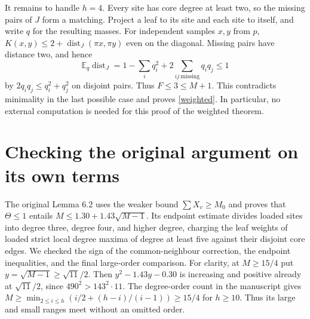 \documentclass[11pt,a4paper]{article}
\theoremstyle{remark}\newtheorem*{remark}{Remark}
\DeclareMathOperator{\dist}{dist}
\begin{document}
It remains to handle $h=4$. Every site has core degree at least two, so the missing pairs of $J$ form a matching. Project a leaf to its site and each site to itself, and write $q$ for the resulting masses. For independent samples $x,y$ from $p$, $K(x,y)\le2+\dist_J(\pi x,\pi y)$ even on the diagonal. Missing pairs have distance two, and hence
\[
 \mathbb E_q\dist_J
 =1-\sum_i q_i^2+2\sum_{ij\ \mathrm{missing}}q_iq_j\le1
\]
by $2q_iq_j\le q_i^2+q_j^2$ on disjoint pairs. Thus $F\le3\le M+1$. This contradicts minimality in the last possible case and proves \eqref{weighted}. In particular, no external computation is needed for this proof of the weighted theorem.

\section{Checking the original argument on its own terms}\label{sec:check}
The original Lemma 6.2 uses the weaker bound $\sum X_v\ge M_0$ and proves that $\Theta\le1$ entails $M\le 1.30+1.43\sqrt{M-1}$. Its endpoint estimate divides loaded sites into degree three, degree four, and higher degree, charging the leaf weights of loaded strict local degree maxima of degree at least five against their disjoint core edges. We checked the sign of the common-neighbour correction, the endpoint inequalities, and the final large-order comparison. For clarity, at $M\ge15/4$ put $y=\sqrt{M-1}\ge\sqrt{11}/2$. Then $y^2-1.43y-0.30$ is increasing and positive already at $\sqrt{11}/2$, since $490^2>143^2\cdot11$. The degree-order count in the manuscript gives $M\ge\min_{2\le i\le h}(i/2+(h-i)/(i-1))\ge15/4$ for $h\ge10$. Thus its large and small ranges meet without an omitted order.
\end{document}
